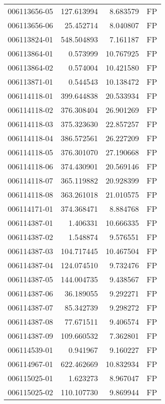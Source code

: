 \begin{tabular}{lrrl}
006113656-05 &  127.613994 &       8.683579 &   FP \\
006113656-06 &   25.452714 &       8.040807 &   FP \\
006113824-01 &  548.504893 &       7.161187 &   FP \\
006113864-01 &    0.573999 &      10.767925 &   FP \\
006113864-02 &    0.574004 &      10.421580 &   FP \\
006113871-01 &    0.544543 &      10.138472 &   FP \\
006114118-01 &  399.644838 &      20.533934 &   FP \\
006114118-02 &  376.308404 &      26.901269 &   FP \\
006114118-03 &  375.323630 &      22.857257 &   FP \\
006114118-04 &  386.572561 &      26.227209 &   FP \\
006114118-05 &  376.301070 &      27.190668 &   FP \\
006114118-06 &  374.430901 &      20.569146 &   FP \\
006114118-07 &  365.119882 &      20.928399 &   FP \\
006114118-08 &  363.261018 &      21.010575 &   FP \\
006114171-01 &  374.368471 &       8.884768 &   FP \\
006114387-01 &    1.406331 &      10.666335 &   FP \\
006114387-02 &    1.548874 &       9.576551 &   FP \\
006114387-03 &  104.717445 &      10.467504 &   FP \\
006114387-04 &  124.074510 &       9.732476 &   FP \\
006114387-05 &  144.004735 &       9.438567 &   FP \\
006114387-06 &   36.189055 &       9.292271 &   FP \\
006114387-07 &   85.342739 &       9.298272 &   FP \\
006114387-08 &   77.671511 &       9.406574 &   FP \\
006114387-09 &  109.660532 &       7.362801 &   FP \\
006114539-01 &    0.941967 &       9.160227 &   FP \\
006114967-01 &  622.462669 &      10.832934 &   FP \\
006115025-01 &    1.623273 &       8.967047 &   FP \\
006115025-02 &  110.107730 &       9.869944 &   FP \\

\end{tabular}
